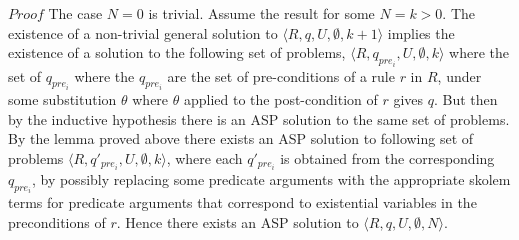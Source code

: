 $Proof$ The case $N=0$ is trivial. Assume
the result for some $N=k>0$. The existence of a non-trivial general solution
to $\langle R,q,U,\emptyset,k+1\rangle$ implies the existence of a solution to
the following set of problems, $\langle R,q_{pre_{i}},U,\emptyset,k\rangle$
where the set of $q_{pre_{i}}$ where the $q_{pre_{i}}$ are the set of
pre-conditions of a rule $r$ in $R$, under some substitution $\theta$ where
$\theta$ applied to the post-condition of $r$ gives $q$. But then by the
inductive hypothesis there is an ASP solution to the same set of problems. By
the lemma proved above there exists an ASP solution to following set of
problems $\langle R,q'_{pre_{i}},U,\emptyset,k\rangle$, where each
$q'_{pre_{i}}$ is obtained from the corresponding $q_{pre_{i}}$, by possibly
replacing some predicate arguments with the appropriate skolem terms for
predicate arguments that correspond to existential variables in the
preconditions of $r$. Hence there exists an ASP solution to
$\langle R,q,U,\emptyset,N\rangle$.

